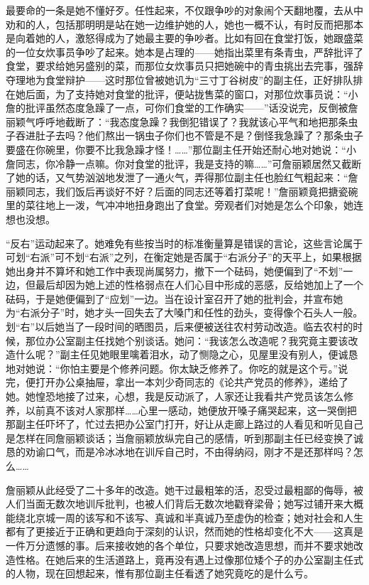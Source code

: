 \par 最要命的一条是她不懂好歹。任性起来，不仅跟争吵的对象闹个天翻地覆，去从中劝和的人，包括那明明是站在她一边维护她的人，她也一概不认，有时反而把那本是向着她的人，激怒得成为了她最主要的争吵者。比如有回在食堂打饭，她跟盛菜的一位女炊事员争吵了起来。她本是占理的——她指出菜里有条青虫，严辞批评了食堂，要求给她另盛别的菜，而那位女炊事员只把她碗中的青虫挑出去完事，强辞夺理地为食堂辩护——这时那位曾被她讥为“三寸丁谷树皮”的副主任，正好排队排在她后面，为了支持她对食堂的批评，便站拢售菜的窗口，对那位炊事员说：“小詹的批评虽然态度急躁了一点，可你们食堂的工作确实——”话没说完，反倒被詹丽颖气呼呼地截断了：“我态度急躁？我倒犯错误了？我就该心平气和地把那条虫子吞进肚子去吗？他们熬出一锅虫子你们也不管是不是？倒怪我急躁了？那条虫子要盛在你碗里，你要不比我急躁才怪！……”那位副主任开始还耐心地对她说：“小詹同志，你冷静一点嘛。你对食堂的批评，我是支持的嘛……”可詹丽颖居然又截断了她的话，又气势汹汹地发泄了一通火气，弄得那位副主任也脸红气粗起来：“詹丽颖同志，我们饭后再谈好不好？后面的同志还等着打菜呢！”詹丽颖竟把搪瓷碗里的菜往地上一泼，气冲冲地扭身跑出了食堂。旁观者们对她是怎么个印象，她连想也没想。
\par “反右”运动起来了。她难免有些按当时的标准衡量算是错误的言论，这些言论属于可划“右派”可不划“右派”之列，在衡定她是否属于“右派分子”的天平上，如果根据她出身并不算坏和她工作中表现尚属努力，撤下一个砝码，她便偏到了“不划”一边，但最后却因为她上述的性格弱点在人们心目中形成的恶感，反给她加上了一个砝码，于是她便偏到了“应划”一边。当在设计室召开了她的批判会，并宣布她为“右派分子”时，她才头一回失去了大嗓门和任性的劲头，变得像个石头人一般。划“右”以后她当了一段时间的晒图员，后来便被送往农村劳动改造。临去农村的时候，那位办公室副主任找她个别谈话。她问：“我该怎么改造呢？我究竟主要该改造什么呢？”副主任见她眼里噙着泪水，动了恻隐之心，见屋里没有别人，便诚恳地对她说：“你怕主要是个修养问题。你太缺乏修养了。你吃的就是这个亏。”说完，便打开办公桌抽屉，拿出一本刘少奇同志的《论共产党员的修养》，递给了她。她惶恐地接了过来，心想，我是反动派了，人家还让我看共产党员该怎么修养，以前真不该对人家那样……心里一感动，她便放开嗓子痛哭起来，这一哭倒把那副主任吓坏了，忙过去把办公室门打开，好让从走廊上路过的人看见和听见自己是怎样在同詹丽颖谈话；当詹丽颖放纵完自己的感情，听到那副主任已经变换了诚恳的劝谕口气，而是冷冰冰地在训斥自己时，不由得纳闷，刚才不是还那样吗？怎么……
\par 詹丽颖从此经受了二十多年的改造。她干过最粗笨的活，忍受过最粗鄙的侮辱，被人们当面无数次地训斥批判，也被人们背后无数次地戳脊梁骨；她写过铺开来大概能绕北京城一周的该写和不该写、真诚和半真诚乃至虚伪的检查；她对社会和人生都有了更接近于正确和更趋向于深刻的认识，然而她的性格却变化不大——这真是一件万分遗憾的事。后来接收她的各个单位，只要求她改造思想，而并不要求她改造性格。在她后来的生活道路上，竟再没有遇上过像那位矮个子的办公室副主任式的人物，现在回想起来，惟有那位副主任看透了她究竟吃的是什么亏。
